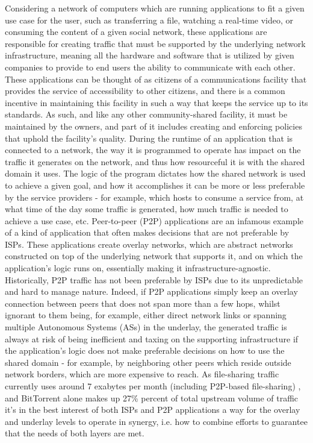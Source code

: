     Considering a network of computers which are running applications to fit a given use case for the user, such as transferring a file, watching a real-time video, or consuming the content of a given social network, these applications are responsible for creating traffic that must be supported by the underlying network infrastructure, meaning all the hardware and software that is utilized by given companies to provide to end users the ability to communicate with each other.
    These applications can be thought of as citizens of a communications facility that provides the service of accessibility to other citizens, and there is a common incentive in maintaining this facility in such a way that keeps the service up to its standards.
    As such, and like any other community-shared facility, it must be maintained by the owners, and part of it includes creating and enforcing policies that uphold the facility's quality.
    During the runtime of an application that is connected to a network, the way it is programmed to operate has impact on the traffic it generates on the network, and thus how resourceful it is with the shared domain it uses.
    The logic of the program dictates how the shared network is used to achieve a given goal, and how it accomplishes it can be more or less preferable by the service providers - for example, which hosts to consume a service from, at what time of the day some traffic is generated, how much traffic is needed to achieve a use case, etc.
    Peer-to-peer (P2P) applications are an infamous example of a kind of application that often makes decisions that are not preferable by ISPs.
    These applications create overlay networks, which are abstract networks constructed on top of the underlying network that supports it, and on which the application's logic runs on, essentially making it infrastructure-agnostic.
    Historically, P2P traffic has not been preferable by ISPs due to its unpredictable and hard to manage nature.
    Indeed, if P2P applications simply keep an overlay connection between peers that does not span more than a few hops, whilst ignorant to them being, for example, either direct network links or spanning multiple Autonomous Systems (ASs) in the underlay, the generated traffic is always at risk of being inefficient and taxing on the supporting infrastructure if the application's logic does not make preferable decisions on how to use the shared domain - for example, by neighboring other peers which reside outside network borders, which are more expensive to reach.
    As file-sharing traffic currently uses around 7 exabytes per month (including P2P-based file-sharing) \cite{cisco2019}, and BitTorrent alone makes up 27\% percent of total upstream volume of traffic \cite{sandvine2019} it's in the best interest of both ISPs and P2P applications a way for the overlay and underlay levels to operate in synergy, i.e. how to combine efforts to guarantee that the needs of both layers are met.

